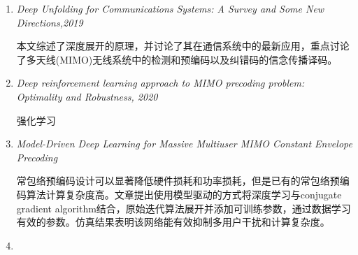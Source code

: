 \begin{enumerate}
    \item \emph{Deep Unfolding for Communications Systems: A Survey and Some New Directions,2019}\par 
        本文综述了深度展开的原理，并讨论了其在通信系统中的最新应用，重点讨论了多天线(MIMO)无线系统中的检测和预编码以及纠错码的信念传播译码。
    \item \emph{Deep reinforcement learning approach to MIMO precoding problem: Optimality and Robustness, 2020}\par 
        强化学习
    \item \emph{Model-Driven Deep Learning for Massive Multiuser MIMO Constant Envelope Precoding} \par 
        常包络预编码设计可以显著降低硬件损耗和功率损耗，但是已有的常包络预编码算法计算复杂度高。文章提出使用模型驱动的方式将深度学习与conjugate gradient algorithm结合，原始迭代算法展开并添加可训练参数，通过数据学习有效的参数。仿真结果表明该网络能有效抑制多用户干扰和计算复杂度。
    \item \emph{}
    
\end{enumerate}
